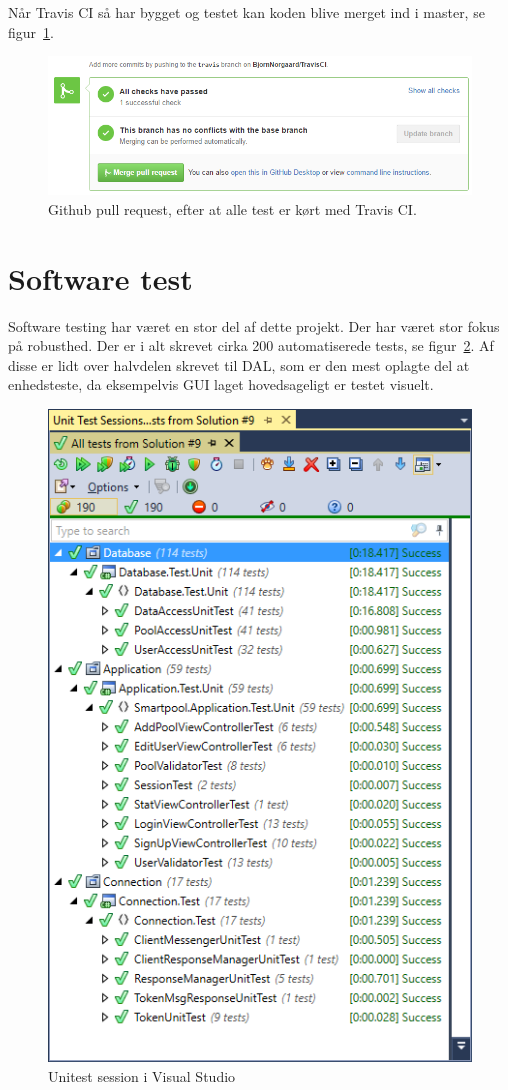Når Travis CI så har bygget og testet kan koden blive merget ind i master, se figur~\ref{fig:travisgithubsuccess}.

\begin{figure}[h]
	\centering
	\includegraphics[width=0.9\linewidth]{figs/processProjektGennemforsel/travis/travisgithubsuccess}
	\caption{Github pull request, efter at alle test er kørt med Travis CI.}
	\label{fig:travisgithubsuccess}
\end{figure}

\section{Software test}
Software testing har været en stor del af dette projekt. Der har været stor fokus på robusthed. Der er i alt skrevet cirka 200 automatiserede tests, se figur~\ref{fig:vsUnittest}. Af disse er lidt over halvdelen skrevet til DAL, som er den mest oplagte del at enhedsteste, da eksempelvis GUI laget hovedsageligt er testet visuelt.

\begin{figure}[h]
	\centering
	\includegraphics[width=0.5\linewidth]{figs/processProjektGennemforsel/vsUnittest}
	\caption{Unitest session i Visual Studio}
	\label{fig:vsUnittest}
\end{figure}

